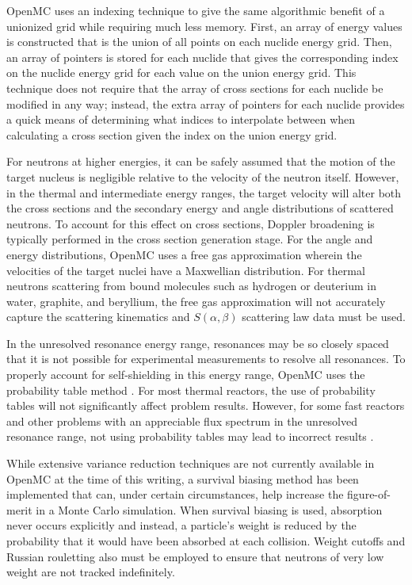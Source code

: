 \documentclass[authoryear,preprint]{elsarticle}
\begin{document}
OpenMC uses an indexing technique to give the same algorithmic benefit of a
unionized grid while requiring much less memory. First, an array of energy
values is constructed that is the union of all points on each nuclide energy
grid. Then, an array of pointers is stored for each nuclide that gives the
corresponding index on the nuclide energy grid for each value on the union
energy grid. This technique does not require that the array of cross sections
for each nuclide be modified in any way; instead, the extra array of pointers
for each nuclide provides a quick means of determining what indices to
interpolate between when calculating a cross section given the index on the
union energy grid.

For neutrons at higher energies, it can be safely assumed that the motion of the
target nucleus is negligible relative to the velocity of the neutron
itself. However, in the thermal and intermediate energy ranges, the target
velocity will alter both the cross sections and the secondary energy and angle
distributions of scattered neutrons. To account for this effect on cross
sections, Doppler broadening is typically performed in the cross section
generation stage. For the angle and energy distributions, OpenMC uses a free gas
approximation \citep{freegas} wherein the velocities of the target nuclei have a
Maxwellian distribution. For thermal neutrons scattering from bound molecules
such as hydrogen or deuterium in water, graphite, and beryllium, the free gas
approximation will not accurately capture the scattering kinematics and
$S(\alpha,\beta)$ scattering law data must be used.

In the unresolved resonance energy range, resonances may be so closely spaced
that it is not possible for experimental measurements to resolve all
resonances. To properly account for self-shielding in this energy range, OpenMC
uses the probability table method \citep{probtables}. For most thermal reactors,
the use of probability tables will not significantly affect problem
results. However, for some fast reactors and other problems with an appreciable
flux spectrum in the unresolved resonance range, not using probability tables
may lead to incorrect results \citep{probtables-testing}.

While extensive variance reduction techniques are not currently available in
OpenMC at the time of this writing, a survival biasing method has been
implemented that can, under certain circumstances, help increase the
figure-of-merit in a Monte Carlo simulation. When survival biasing is used,
absorption never occurs explicitly and instead, a particle's weight is reduced
by the probability that it would have been absorbed at each collision. Weight
cutoffs and Russian rouletting also must be employed to ensure that neutrons of
very low weight are not tracked indefinitely.
\end{document}
